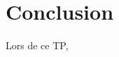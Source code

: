 \documentclass[12pt]{article}
\begin{document}
\begin{lstlisting}[style=languageClarge, caption=Code pour encoder une image]

\end{lstlisting}

\section{Conclusion}
Lors de ce TP, 
\end{document}
